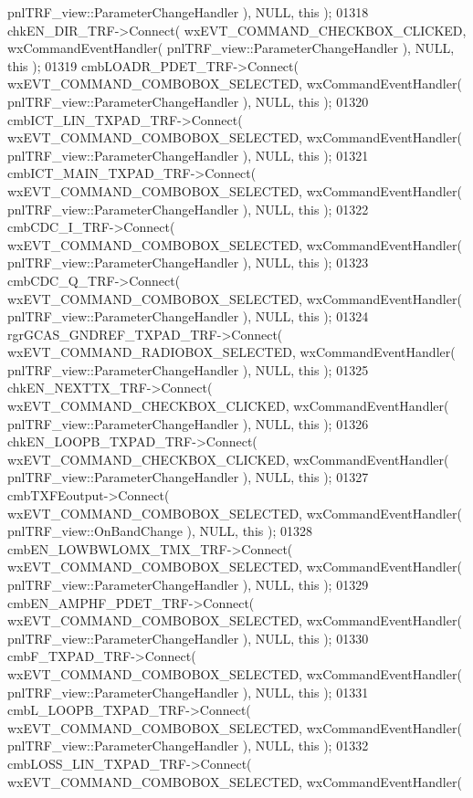 \begin{DoxyCode}
      pnlTRF_view::ParameterChangeHandler ), NULL, \textcolor{keyword}{this} );
01318     chkEN_DIR_TRF->Connect( wxEVT\_COMMAND\_CHECKBOX\_CLICKED, wxCommandEventHandler( 
      pnlTRF_view::ParameterChangeHandler ), NULL, \textcolor{keyword}{this} );
01319     cmbLOADR_PDET_TRF->Connect( wxEVT\_COMMAND\_COMBOBOX\_SELECTED, wxCommandEventHandler( 
      pnlTRF_view::ParameterChangeHandler ), NULL, \textcolor{keyword}{this} );
01320     cmbICT_LIN_TXPAD_TRF->Connect( wxEVT\_COMMAND\_COMBOBOX\_SELECTED, wxCommandEventHandler( 
      pnlTRF_view::ParameterChangeHandler ), NULL, \textcolor{keyword}{this} );
01321     cmbICT_MAIN_TXPAD_TRF->Connect( wxEVT\_COMMAND\_COMBOBOX\_SELECTED, wxCommandEventHandler( 
      pnlTRF_view::ParameterChangeHandler ), NULL, \textcolor{keyword}{this} );
01322     cmbCDC_I_TRF->Connect( wxEVT\_COMMAND\_COMBOBOX\_SELECTED, wxCommandEventHandler( 
      pnlTRF_view::ParameterChangeHandler ), NULL, \textcolor{keyword}{this} );
01323     cmbCDC_Q_TRF->Connect( wxEVT\_COMMAND\_COMBOBOX\_SELECTED, wxCommandEventHandler( 
      pnlTRF_view::ParameterChangeHandler ), NULL, \textcolor{keyword}{this} );
01324     rgrGCAS_GNDREF_TXPAD_TRF->Connect( wxEVT\_COMMAND\_RADIOBOX\_SELECTED, wxCommandEventHandler( 
      pnlTRF_view::ParameterChangeHandler ), NULL, \textcolor{keyword}{this} );
01325     chkEN_NEXTTX_TRF->Connect( wxEVT\_COMMAND\_CHECKBOX\_CLICKED, wxCommandEventHandler( 
      pnlTRF_view::ParameterChangeHandler ), NULL, \textcolor{keyword}{this} );
01326     chkEN_LOOPB_TXPAD_TRF->Connect( wxEVT\_COMMAND\_CHECKBOX\_CLICKED, wxCommandEventHandler( 
      pnlTRF_view::ParameterChangeHandler ), NULL, \textcolor{keyword}{this} );
01327     cmbTXFEoutput->Connect( wxEVT\_COMMAND\_COMBOBOX\_SELECTED, wxCommandEventHandler( 
      pnlTRF_view::OnBandChange ), NULL, \textcolor{keyword}{this} );
01328     cmbEN_LOWBWLOMX_TMX_TRF->Connect( wxEVT\_COMMAND\_COMBOBOX\_SELECTED, wxCommandEventHandler( 
      pnlTRF_view::ParameterChangeHandler ), NULL, \textcolor{keyword}{this} );
01329     cmbEN_AMPHF_PDET_TRF->Connect( wxEVT\_COMMAND\_COMBOBOX\_SELECTED, wxCommandEventHandler( 
      pnlTRF_view::ParameterChangeHandler ), NULL, \textcolor{keyword}{this} );
01330     cmbF_TXPAD_TRF->Connect( wxEVT\_COMMAND\_COMBOBOX\_SELECTED, wxCommandEventHandler( 
      pnlTRF_view::ParameterChangeHandler ), NULL, \textcolor{keyword}{this} );
01331     cmbL_LOOPB_TXPAD_TRF->Connect( wxEVT\_COMMAND\_COMBOBOX\_SELECTED, wxCommandEventHandler( 
      pnlTRF_view::ParameterChangeHandler ), NULL, \textcolor{keyword}{this} );
01332     cmbLOSS_LIN_TXPAD_TRF->Connect( wxEVT\_COMMAND\_COMBOBOX\_SELECTED, wxCommandEventHandler( 

\end{DoxyCode}
